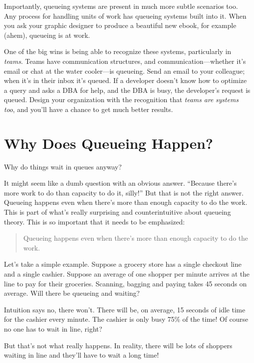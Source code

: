 \documentclass{vivid_layout}
\begin{document}
Importantly, queueing systems are present in much more subtle scenarios too. Any process for handling units of work has queueing systems built into it. When you ask your graphic designer to produce a beautiful new ebook, for example (ahem), queueing is at work.

One of the big wins is being able to recognize these systems, particularly in {\itshape teams}. Teams have communication structures, and communication---whether it's email or chat at the water cooler---is queueing. Send an email to your colleague; when it's in their inbox it's queued. If a developer doesn't know how to optimize a query and asks a DBA for help, and the DBA is busy, the developer's request is queued. Design your organization with the recognition that {\itshape teams are systems too}, and you'll have a chance to get much better results.

\section{Why Does Queueing Happen?}

Why do things wait in queues anyway?

It might seem like a dumb question with an obvious answer. ``Because there's more work to do than capacity to do it, silly!'' But that is not the right answer. Queueing happens even when there's more than enough capacity to do the work. This is part of what's really surprising and counterintuitive about queueing theory. This is so important that it needs to be emphasized:

\begin{quote}
Queueing happens even when there's more than enough capacity to do the work.
\end{quote}

Let's take a simple example. Suppose a grocery store has a single checkout line and a single cashier. Suppose an average of one shopper per minute arrives at the line to pay for their groceries. Scanning, bagging and paying takes 45 seconds on average. Will there be queueing and waiting?

Intuition says no, there won't. There will be, on average, 15 seconds of idle time for the cashier every minute. The cashier is only busy 75\% of the time! Of course no one has to wait in line, right?

But that's not what really happens. In reality, there will be lots of shoppers waiting in line and they'll have to wait a long time!
\end{document}
